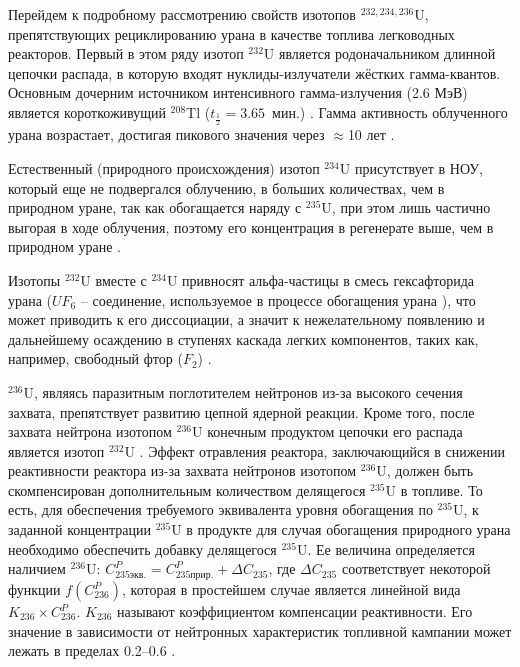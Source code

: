 Перейдем к подробному рассмотрению свойств изотопов $^{232,234,236}$U, препятствующих рециклированию урана в качестве топлива легководных реакторов.
Первый в этом ряду изотоп $^{232}$U является родоначальником длинной цепочки распада, в которую входят нуклиды-излучатели жёстких гамма-квантов.
Основным дочерним источником интенсивного гамма-излучения (2.6 МэВ) является короткоживущий $^{208}$Tl ($t_{\frac{1}{2}}=3.65$ мин.) \cite{matveevUran232EgoVliyanie1985,abbasProliferationResistanceFeatures2013}. Гамма активность облученного урана возрастает, достигая пикового значения через $\approx$10 лет \cite{gresleyEnrichingRecyclingUranium1988}.

Естественный (природного происхождения) изотоп $^{234}$U присутствует в НОУ, который еще не подвергался облучению, в больших количествах, чем в природном уране, так как обогащается наряду с $^{235}$U, при этом лишь частично выгорая в ходе облучения, поэтому его концентрация в регенерате выше, чем в природном уране \cite{gresleyEnrichingRecyclingUranium1988}.

Изотопы $^{232}$U вместе с $^{234}$U привносят альфа-частицы в смесь гексафторида урана ($UF_6$ -- соединение, используемое в процессе обогащения урана \cite{orlovWayObtainUranium2015, orlovDesublimationPurificationTransporting2017}), что может приводить к его диссоциации, а значит к нежелательному появлению и дальнейшему осаждению в ступенях каскада легких компонентов, таких как, например, свободный фтор ($F_2$) \cite{kryuchkovObogashchennyyUranDobavleniem2007, bernhardtRadiationEffectsAlpha1958, shmelevRazrabotkaRaschetnoyModeli2012}. 

$^{236}$U, являясь паразитным поглотителем нейтронов из-за высокого сечения захвата, препятствует развитию цепной ядерной реакции. Кроме того, после захвата нейтрона изотопом  $^{236}$U конечным продуктом цепочки его распада является изотоп  $^{232}$U \cite{ksenofontovIssledovanieProblemyVovlecheniya1988}.
Эффект отравления реактора, заключающийся в снижении реактивности реактора из-за захвата нейтронов изотопом  $^{236}$U, должен быть скомпенсирован дополнительным количеством делящегося $^{235}$U в топливе.
То есть, для обеспечения требуемого эквивалента уровня обогащения по $^{235}$U, к заданной концентрации $^{235}$U в продукте для случая обогащения природного урана необходимо обеспечить добавку делящегося $^{235}$U.
Ее величина определяется наличием $^{236}$U:
$C_{235 экв.}^{P}=C_{235 прир.}^{P}+\Delta C_{235}$, где $\Delta C_{235}$ соответствует некоторой функции $f\left(C_{236}^{P}\right)$, которая в простейшем случае является линейной вида $K_{236} \times C_{236}^{P}$. $K_{236}$ называют коэффициентом компенсации реактивности. Его значение в зависимости от нейтронных характеристик топливной кампании может лежать в пределах 0.2--0.6 \cite{delagarzaMulticomponentIsotopeSeparation1961, delculAnalysisReuseUranium2009}. 

